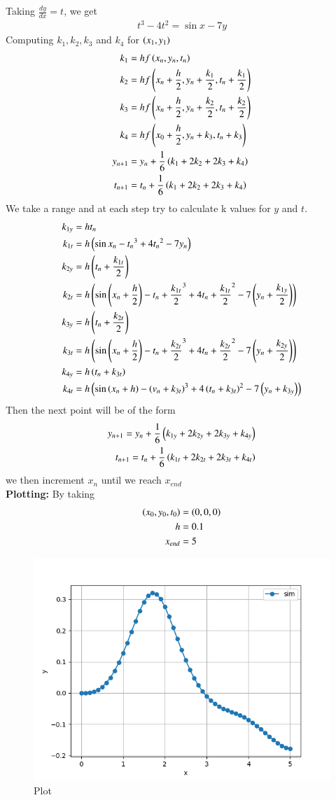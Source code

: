 \documentclass[journal]{IEEEtran}
\begin{document}
Taking $\frac{dy}{dx}=t$, we get
\begin{align}
t^3-4t^2=\sin x-7y
\end{align}
Computing $k_1,k_2,k_3$ and $k_4$ for $\left(x_1,y_1\right)$
\begin{align}
k_1&=hf\left(x_n,y_n,t_n\right)\\
k_2&=hf\left(x_n+\frac{h}{2},y_n+\frac{k_1}{2},t_n+\frac{k_1}{2}\right)\\
k_3&=hf\left(x_n+\frac{h}{2},y_n+\frac{k_2}{2},t_n+\frac{k_2}{2}\right)\\
k_4&=hf\left(x_0+\frac{h}{2},y_n+k_3,t_n+k_3\right)\\
y_{n+1}&=y_n+\frac{1}{6}\left(k_1+2k_2+2k_3+k_4\right)\\
t_{n+1}&=t_n+\frac{1}{6}\left(k_1+2k_2+2k_3+k_4\right)
\end{align}
We take a range  and at each step try to calculate k values for $y$ and $t$.
\begin{align}
k_{1y}&= ht_n\\
k_{1t}&=h\left(\sin x_n-{t_n}^3+4{t_n}^2-7y_n\right)\\
k_{2y}&= h\left(t_n+\frac{k_{1t}}{2}\right)\\
k_{2t}&=h\left(\sin \left(x_n+\frac{h}{2}\right)-{t_n+\frac{k_{1t}}{2}}^3+4{t_n+\frac{k_{1t}}{2}}^2-7\left(y_n+\frac{k_{1y}}{2}\right)\right)\\
k_{3y}&= h\left(t_n+\frac{k_{2t}}{2}\right)\\
k_{3t}&=h\left(\sin \left(x_n+\frac{h}{2}\right)-{t_n+\frac{k_{2t}}{2}}^3+4{t_n+\frac{k_{2t}}{2}}^2-7\left(y_n+\frac{k_{2y}}{2}\right)\right)\\
k_{4y}&=h\left(t_n+k_{3t}\right)\\
k_{4t}&=h\left(\sin\left(x_n+h\right)-\left(v_n+k_{3t}\right)^3+4\left(t_n+k_{3t}\right)^2-7\left(y_n+k_{3y}\right)\right)
\end{align}
Then the next point will be of the form 
\begin{align}
y_{n+1}=y_n+\frac{1}{6}\left(k_{1y}+2k_{2y}+2k_{3y}+k_{4y}\right)\\
t_{n+1}=t_n+\frac{1}{6}\left(k_{1t}+2k_{2t}+2k_{3t}+k_{4t}\right)
\end{align}
we then increment $x_n$ until we reach $x_{end}$\\
\textbf{Plotting:}
By taking 
\begin{align}
\left(x_0,y_0,t_0\right)&=\left(0,0,0\right)\\
h&=0.1\\
x_{end}&=5
\end{align}
\begin{figure}[h!]
   \centering
   \includegraphics[width=1\columnwidth]{Figs/Figure_1.png}
   \caption{Plot}
\end{figure}
\end{document}
